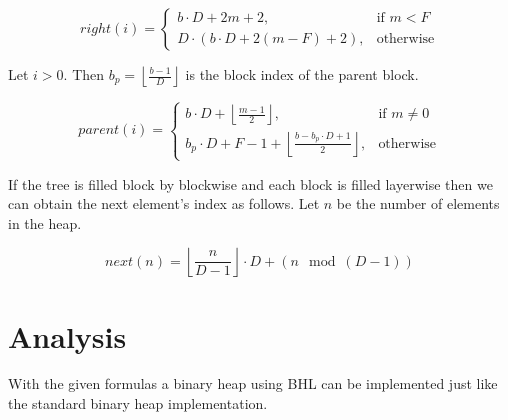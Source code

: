 \documentclass[10pt, a4paper]{article}
\begin{document}
\[right(i) = \begin{cases} b\cdot D + 2m + 2, & \textrm{if }m < F \\ D\cdot (b\cdot D + 2(m-F)+2), & \textrm{otherwise} \end{cases}\]

Let $i>0$. Then $b_p=\left\lfloor\frac{b-1}{D}\right\rfloor$ is the block index of the parent block.

\[parent(i) = \begin{cases} b\cdot D + \left\lfloor\frac{m - 1}{2}\right\rfloor, & \textrm{if }m \neq 0 \\ b_p \cdot D + F - 1 + \left\lfloor\frac{b-b_p\cdot D + 1}{2}\right\rfloor, & \textrm{otherwise} \end{cases}\]

If the tree is filled block by blockwise and each block is filled layerwise then we can obtain the next element's index as follows. Let $n$ be the number of elements in the heap.

\[next(n)=\left\lfloor\frac{n}{D-1}\right\rfloor\cdot D + (n \mod (D-1))\]

\section{Analysis}

With the given formulas a binary heap using BHL can be implemented just like the standard binary heap implementation.
\end{document}
